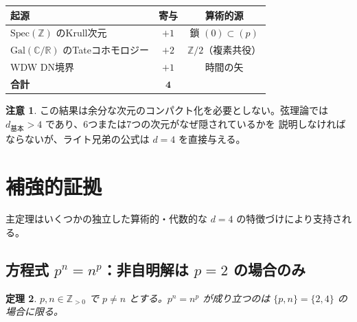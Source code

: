 \documentclass[12pt,a4paper]{article}
\newtheorem{theorem}{定理}[section]
\theoremstyle{definition}
\newtheorem{remark}[theorem]{注意}
\newcommand{\Spec}{\mathrm{Spec}}
\newcommand{\Gal}{\mathrm{Gal}}
\newcommand{\ZZ}{\mathbb{Z}}
\newcommand{\RR}{\mathbb{R}}
\newcommand{\CC}{\mathbb{C}}
\begin{document}
\begin{center}
\begin{tabular}{lcc}
\toprule
\textbf{起源} & \textbf{寄与} & \textbf{算術的源} \\
\midrule
$\Spec(\ZZ)$ のKrull次元 & $+1$ & 鎖 $(0) \subset (p)$ \\
$\Gal(\CC/\RR)$ のTateコホモロジー & $+2$ & $\ZZ/2$（複素共役）\\
WDW DN境界 & $+1$ & 時間の矢 \\
\midrule
\textbf{合計} & $\mathbf{4}$ & \\
\bottomrule
\end{tabular}
\end{center}

\begin{remark}
この結果は余分な次元のコンパクト化を必要としない。弦理論では
$d_{\text{基本}} > 4$ であり、6つまたは7つの次元がなぜ隠されているかを
説明しなければならないが、ライト兄弟の公式は $d=4$ を直接与える。
\end{remark}

\section{補強的証拠}\label{sec:supporting}

主定理はいくつかの独立した算術的・代数的な $d=4$ の特徴づけにより支持される。

\subsection{方程式 $p^n = n^p$：非自明解は $p=2$ の場合のみ}

\begin{theorem}\label{thm:pn_np}
$p, n \in \ZZ_{>0}$ で $p \neq n$ とする。$p^n = n^p$ が成り立つのは
$\{p, n\} = \{2, 4\}$ の場合に限る。
\end{theorem}
\end{document}
